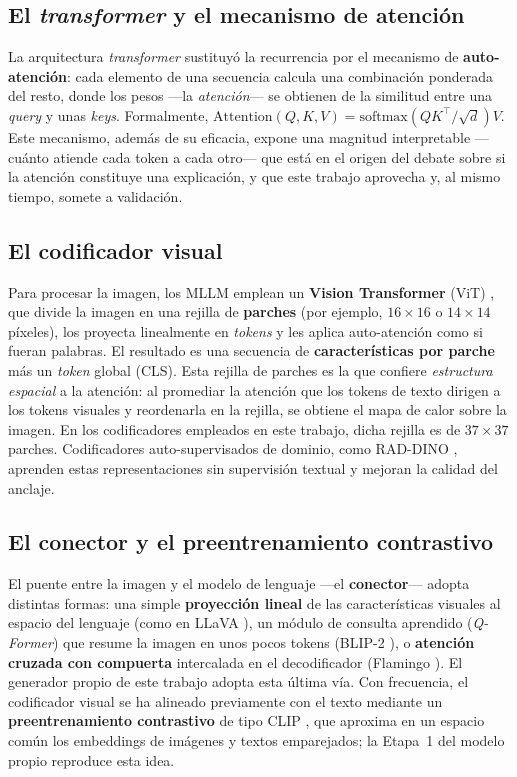 \subsection{El \textit{transformer} y el mecanismo de atención}
La arquitectura \textit{transformer} \parencite{vaswani2017} sustituyó la recurrencia por el
mecanismo de \textbf{auto-atención}: cada elemento de una secuencia calcula una combinación ponderada
del resto, donde los pesos —la \emph{atención}— se obtienen de la similitud entre una \textit{query} y
unas \textit{keys}. Formalmente, $\mathrm{Attention}(Q,K,V)=\mathrm{softmax}(QK^{\top}/\sqrt{d})V$.
Este mecanismo, además de su eficacia, expone una magnitud interpretable —cuánto atiende cada token a
cada otro— que está en el origen del debate sobre si la atención constituye una explicación, y que
este trabajo aprovecha y, al mismo tiempo, somete a validación.

\subsection{El codificador visual}
Para procesar la imagen, los MLLM emplean un \textbf{Vision Transformer} (ViT)
\parencite{dosovitskiy2021}, que divide la imagen en una rejilla de \textbf{parches} (por ejemplo,
$16\times16$ o $14\times14$ píxeles), los proyecta linealmente en \textit{tokens} y les aplica
auto-atención como si fueran palabras. El resultado es una secuencia de \textbf{características por
parche} más un \textit{token} global (CLS). Esta rejilla de parches es la que confiere \emph{estructura
espacial} a la atención: al promediar la atención que los tokens de texto dirigen a los tokens
visuales y reordenarla en la rejilla, se obtiene el mapa de calor sobre la imagen. En los codificadores
empleados en este trabajo, dicha rejilla es de $37\times37$ parches. Codificadores auto-supervisados de
dominio, como RAD-DINO \parencite{perezgarcia2024}, aprenden estas representaciones sin supervisión
textual y mejoran la calidad del anclaje.

\subsection{El conector y el preentrenamiento contrastivo}
El puente entre la imagen y el modelo de lenguaje —el \textbf{conector}— adopta distintas formas: una
simple \textbf{proyección lineal} de las características visuales al espacio del lenguaje (como en
LLaVA \parencite{liu2023llava}), un módulo de consulta aprendido (\textit{Q-Former}) que resume la
imagen en unos pocos tokens (BLIP-2 \parencite{li2023blip2}), o \textbf{atención cruzada con
compuerta} intercalada en el decodificador (Flamingo \parencite{alayrac2022}). El generador propio de
este trabajo adopta esta última vía. Con frecuencia, el codificador visual se ha alineado previamente
con el texto mediante un \textbf{preentrenamiento contrastivo} de tipo CLIP \parencite{radford2021},
que aproxima en un espacio común los embeddings de imágenes y textos emparejados; la Etapa~1 del
modelo propio reproduce esta idea.

